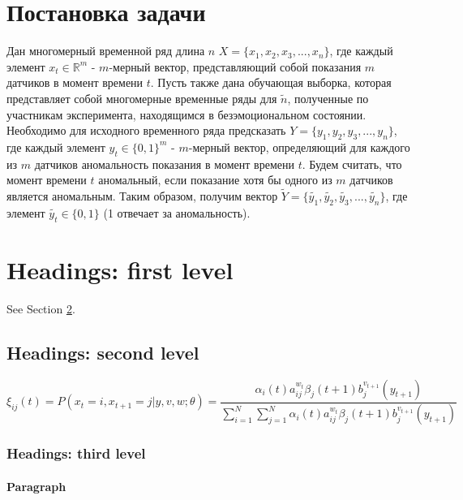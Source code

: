 \documentclass{article}
\begin{document}
\section{Постановка задачи}
Дан многомерный временной ряд длина $n$ $X = \{x_1, x_2, x_3, ..., x_n\}$, где каждый элемент $x_t \in \mathbb{R}^{m}$ - $m$-мерный вектор, представляющий собой показания $m$ датчиков в момент времени $t$. Пусть также дана обучающая выборка, которая представляет собой многомерные временные ряды для $\widetilde{n}$, полученные по участникам эксперимента, находящимся в безэмоциональном состоянии. Необходимо для исходного временного ряда предсказать $Y = \{y_1, y_2, y_3, ..., y_n\}$, где каждый элемент $y_t \in \{0, 1\}^{m}$ - $m$-мерный вектор, определяющий для каждого из $m$ датчиков аномальность показания в момент времени $t$. Будем считать, что момент времени $t$ аномальный, если показание хотя бы одного из $m$ датчиков является аномальным. Таким образом, получим вектор $\widetilde{Y} = \{\widetilde{y_1}, \widetilde{y_2}, \widetilde{y_3}, ..., \widetilde{y_n}\}$, где элемент $\widetilde{y_t} \in \{0, 1\}$ (1 отвечает за аномальность). \\



\section{Headings: first level}
\label{sec:headings}

\lipsum[4] See Section \ref{sec:headings}.

\subsection{Headings: second level}
\lipsum[5]
\begin{equation}
	\xi _{ij}(t)=P(x_{t}=i,x_{t+1}=j|y,v,w;\theta)= {\frac {\alpha _{i}(t)a^{w_t}_{ij}\beta _{j}(t+1)b^{v_{t+1}}_{j}(y_{t+1})}{\sum _{i=1}^{N} \sum _{j=1}^{N} \alpha _{i}(t)a^{w_t}_{ij}\beta _{j}(t+1)b^{v_{t+1}}_{j}(y_{t+1})}}
\end{equation}

\subsubsection{Headings: third level}
\lipsum[6]

\paragraph{Paragraph}
\lipsum[7]
\end{document}

